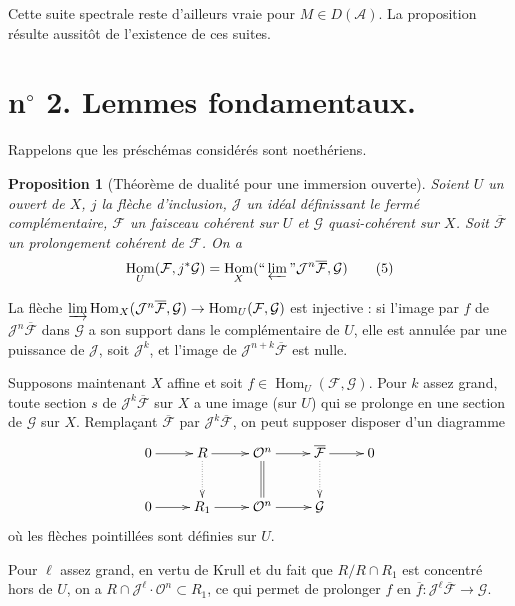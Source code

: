 \documentclass[12pt]{amsart}
\theoremstyle{plain}
\newtheorem{prop}{Proposition}
\theoremstyle{definition}
\DeclareMathOperator{\Hom}{Hom}
\newcommand{\cF}{\mathcal{F}}
\newcommand{\cG}{\mathcal{G}}
\newcommand{\cJ}{\mathcal{J}}
\newcommand{\cO}{\mathcal{O}}
\newcommand{\cA}{\mathcal{A}}
\newcommand{\cD}{D}
\begin{document}
Cette suite spectrale reste d'ailleurs vraie pour $M \in \cD(\cA)$. La proposition r\'esulte aussit\^ot de l'existence de ces suites.

\section*{n$^{\circ}$ 2. Lemmes fondamentaux.}

Rappelons que les pr\'esch\'emas consid\'er\'es sont noeth\'eriens.

\begin{prop}[Th\'eor\`eme de dualit\'e pour une immersion ouverte]
Soient $U$ un ouvert de $X$, $j$ la fl\`eche d'inclusion, $\cJ$ un id\'eal d\'efinissant le ferm\'e compl\'ementaire, $\cF$ un faisceau coh\'erent sur $U$ et $\cG$ quasi-coh\'erent sur $X$. Soit $\overline{\cF}$ un prolongement coh\'erent de $\cF$. On a
\begin{equation*}
\Hom_{U}(\cF, j^{*}\cG) = \Hom_{X}(\text{``}\varprojlim\text{''} \cJ^{n}\overline{\cF}, \cG)
\tag*{\textup{(5)}}
\end{equation*}
\setcounter{footnote}{5}
\end{prop}

La fl\`eche $\varinjlim \Hom_{X}(\cJ^{n}\overline{\cF}, \cG) \to \Hom_{U}(\cF, \cG)$ est injective : si l'image par $f$ de $\cJ^{n}\overline{\cF}$ dans $\cG$ a son support dans le compl\'ementaire de $U$, elle est annul\'ee par une puissance de $\cJ$, soit $\cJ^{k}$, et l'image de $\cJ^{n+k}\overline{\cF}$ est nulle.

Supposons maintenant $X$ affine et soit $f \in \Hom_{U}(\cF, \cG)$. Pour $k$ assez grand, toute section $s$ de $\cJ^{k}\overline{\cF}$ sur $X$ a une image (sur $U$) qui se prolonge en une section de $\cG$ sur $X$. Rempla\c{c}ant $\overline{\cF}$ par $\cJ^{k}\overline{\cF}$, on peut supposer disposer d'un diagramme
\[
\xymatrix{
0 \ar[r] & R \ar[r] \ar@{.>}[d] & \cO^{n} \ar[r] \ar@{=}[d] & \overline{\cF} \ar[r] \ar@{.>}[d] & 0 \\
0 \ar[r] & R_{1} \ar[r] & \cO^{n} \ar[r] & \cG &
}
\]
o\`u les fl\`eches pointill\'ees sont d\'efinies sur $U$.

Pour $\ell$ assez grand, en vertu de Krull et du fait que $R/R \cap R_{1}$ est concentr\'e hors de $U$, on a $R \cap \cJ^{\ell} \cdot \cO^{n} \subset R_{1}$, ce qui permet de prolonger $f$ en $\overline{f}: \cJ^{\ell}\overline{\cF} \to \cG$.
\end{document}
